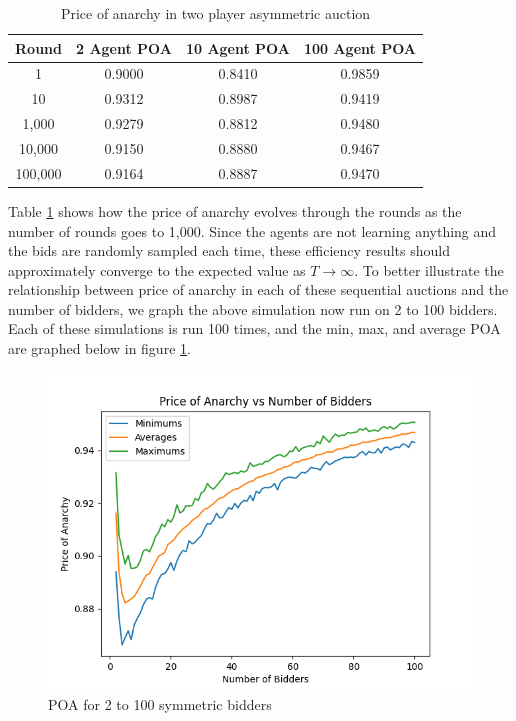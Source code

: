 \documentclass[12pt,twoside]{reedthesis}
\begin{document}
\begin{table}[h!]
	\begin{center}
		\begin{tabular}{ |c|c|c|c| }
			\hline
			Round & 2 Agent POA & 10 Agent POA & 100 Agent POA \\
			\hline
			1 & 0.9000 & 0.8410 & 0.9859\\
			10 & 0.9312 & 0.8987 & 0.9419\\
			1,000 & 0.9279 & 0.8812 & 0.9480\\
			10,000 & 0.9150 & 0.8880 & 0.9467\\
			100,000 & 0.9164 & 0.8887 & 0.9470\\
			\hline
		\end{tabular}
		\caption{Price of anarchy in two player asymmetric auction}
		\label{table:zero_int_symmetric}
	\end{center} 
\end{table}

Table \ref{table:zero_int_symmetric} shows how the price of anarchy evolves through the rounds as the number of rounds goes to 1,000. Since the agents are not learning anything and the bids are randomly sampled each time, these efficiency results should approximately converge to the expected value as $T \rightarrow \infty$. To better illustrate the relationship between price of anarchy in each of these sequential auctions and the number of bidders, we graph the above simulation now run on 2 to 100 bidders. Each of these simulations is run 100 times, and the min, max, and average POA are graphed below in figure \ref{zi_symmetric}.

\begin{figure}[h!]
	\centering
	\includegraphics[scale=.8]{Figures/zi_symmetric}
	\caption{POA for 2 to 100 symmetric bidders}
	\label{zi_symmetric}
\end{figure}
 
\end{document}
